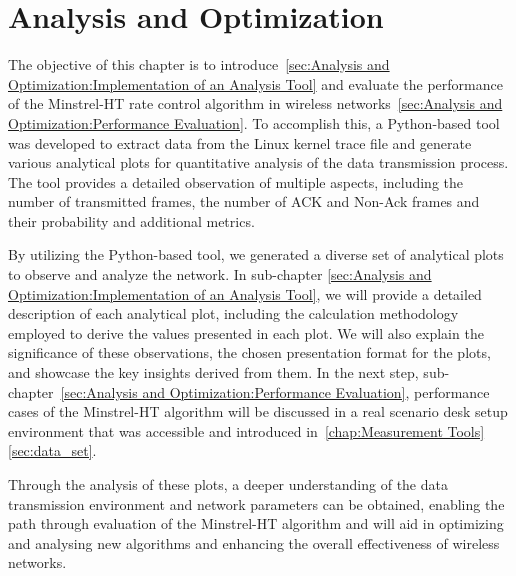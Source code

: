 \chapter{Analysis and Optimization}
\label{chap:Analysis and Optimization}

The objective of this chapter is to introduce~\ref{sec:Analysis and Optimization:Implementation of an Analysis Tool} and evaluate the performance of the Minstrel-HT rate control algorithm in wireless networks~\ref{sec:Analysis and Optimization:Performance Evaluation}. To accomplish this, a Python-based tool was developed to extract data from the Linux kernel trace file and generate various analytical plots for quantitative analysis of the data transmission process. The tool provides a detailed observation of multiple aspects, including the number of transmitted frames, the number of ACK and Non-Ack frames and their probability and additional metrics.

By utilizing the Python-based tool, we generated a diverse set of analytical plots to observe and analyze the network. In sub-chapter \ref{sec:Analysis and Optimization:Implementation of an Analysis Tool}, we will provide a detailed description of each analytical plot, including the calculation methodology employed to derive the values presented in each plot. We will also explain the significance of these observations, the chosen presentation format for the plots, and showcase the key insights derived from them. In the next step, sub-chapter~\ref{sec:Analysis and Optimization:Performance Evaluation}, performance cases of the Minstrel-HT algorithm will be discussed in a real scenario desk setup environment that was accessible and introduced in~\ref{chap:Measurement Tools}\ref{sec:data_set}.

Through the analysis of these plots, a deeper understanding of the data transmission environment and network parameters can be obtained, enabling the path through evaluation of the Minstrel-HT algorithm and will aid in optimizing and analysing new algorithms and enhancing the overall effectiveness of wireless networks.
\newpage


